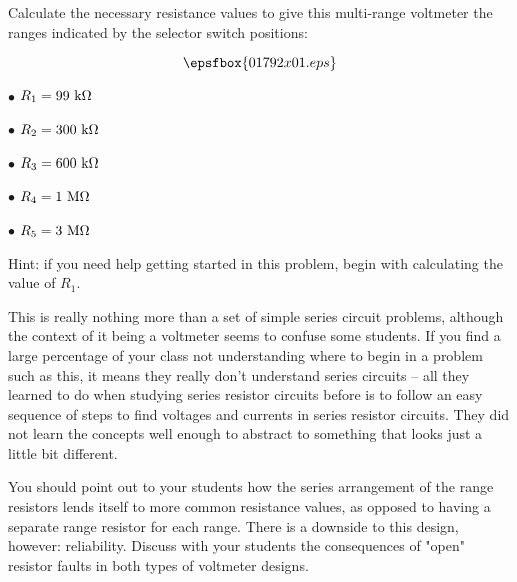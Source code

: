

Calculate the necessary resistance values to give this multi-range voltmeter the ranges indicated by the selector switch positions:

$$\epsfbox{01792x01.eps}$$







\item{$\bullet$} $R_1 = 99 \hbox{ k} \Omega$
\item{$\bullet$} $R_2 = 300 \hbox{ k} \Omega$
\item{$\bullet$} $R_3 = 600 \hbox{ k} \Omega$
\item{$\bullet$} $R_4 = 1 \hbox{ M} \Omega$
\item{$\bullet$} $R_5 = 3 \hbox{ M} \Omega$

\vskip 10pt

Hint: if you need help getting started in this problem, begin with calculating the value of $R_1$.







This is really nothing more than a set of simple series circuit problems, although the context of it being a voltmeter seems to confuse some students.  If you find a large percentage of your class not understanding where to begin in a problem such as this, it means they really don't understand series circuits -- all they learned to do when studying series resistor circuits before is to follow an easy sequence of steps to find voltages and currents in series resistor circuits.  They did not learn the concepts well enough to abstract to something that looks just a little bit different.

You should point out to your students how the series arrangement of the range resistors lends itself to more common resistance values, as opposed to having a separate range resistor for each range.  There is a downside to this design, however: reliability.  Discuss with your students the consequences of "open" resistor faults in both types of voltmeter designs.




